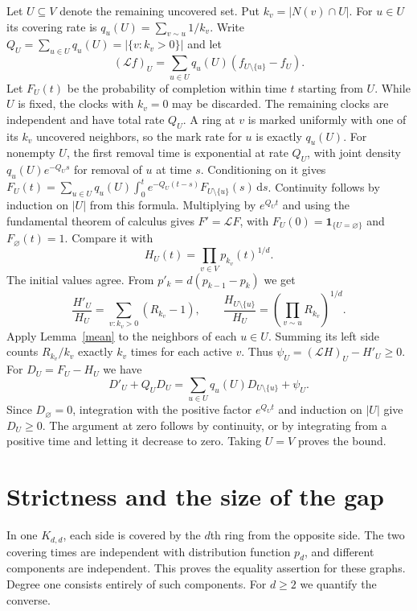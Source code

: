 \documentclass[11pt,a4paper]{article}
\theoremstyle{remark}
\newcommand{\dd}{\,\mathrm d}
\begin{document}
Let \(U\subseteq V\) denote the remaining uncovered set. Put \(k_v=|N(v)\cap U|\). For \(u\in U\) its covering rate is \(q_u(U)=\sum_{v\sim u}1/k_v\). Write \(Q_U=\sum_{u\in U}q_u(U)=|\{v:k_v>0\}|\) and let
\[
 (\mathcal L f)_U=\sum_{u\in U}q_u(U)(f_{U\setminus\{u\}}-f_U).
\]
Let \(F_U(t)\) be the probability of completion within time \(t\) starting from \(U\). While \(U\) is fixed, the clocks with \(k_v=0\) may be discarded. The remaining clocks are independent and have total rate \(Q_U\). A ring at \(v\) is marked uniformly with one of its \(k_v\) uncovered neighbors, so the mark rate for \(u\) is exactly \(q_u(U)\). For nonempty \(U\), the first removal time is exponential at rate \(Q_U\), with joint density \(q_u(U)e^{-Q_U s}\) for removal of \(u\) at time \(s\). Conditioning on it gives \(F_U(t)=\sum_{u\in U}q_u(U)\int_0^t e^{-Q_U(t-s)}F_{U\setminus\{u\}}(s)\dd s\). Continuity follows by induction on \(|U|\) from this formula. Multiplying by \(e^{Q_U t}\) and using the fundamental theorem of calculus gives \(F'=\mathcal L F\), with \(F_U(0)=\mathbf1_{\{U=\varnothing\}}\) and \(F_\varnothing(t)=1\). Compare it with
\[
                       H_U(t)=\prod_{v\in V}p_{k_v}(t)^{1/d}.
\]
The initial values agree. From \(p'_k=d(p_{k-1}-p_k)\) we get
\[
 \frac{H'_U}{H_U}=\sum_{v:k_v>0}(R_{k_v}-1),
 \qquad
 \frac{H_{U\setminus\{u\}}}{H_U}
       =\left(\prod_{v\sim u}R_{k_v}\right)^{1/d}.
\]
Apply Lemma~\ref{mean} to the neighbors of each \(u\in U\). Summing its left side counts \(R_{k_v}/k_v\) exactly \(k_v\) times for each active \(v\). Thus \(\psi_U=(\mathcal LH)_U-H'_U\ge0\). For \(D_U=F_U-H_U\) we have
\begin{equation}\label{comp}
  D'_U+Q_U D_U
       =\sum_{u\in U}q_u(U)D_{U\setminus\{u\}}+\psi_U .
\end{equation}
Since \(D_\varnothing=0\), integration with the positive factor \(e^{Q_Ut}\) and induction on \(|U|\) give \(D_U\ge0\). The argument at zero follows by continuity, or by integrating from a positive time and letting it decrease to zero. Taking \(U=V\) proves the bound.

\section{Strictness and the size of the gap}

In one \(K_{d,d}\), each side is covered by the \(d\)th ring from the opposite side. The two covering times are independent with distribution function \(p_d\), and different components are independent. This proves the equality assertion for these graphs. Degree one consists entirely of such components. For \(d\ge2\) we quantify the converse.
\end{document}
